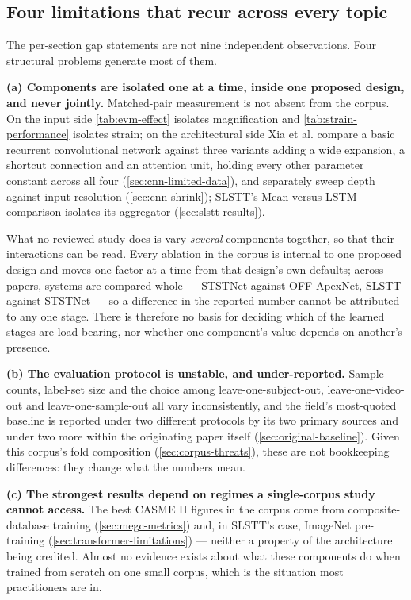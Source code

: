 \subsection{Four limitations that recur across every topic}
\label{sec:four-limitations}

The per-section gap statements are not nine independent observations. Four structural problems generate most of them.

\textbf{(a) Components are isolated one at a time, inside one proposed design, and never jointly.} Matched-pair measurement is not absent from the corpus. On the input side \autoref{tab:evm-effect} isolates magnification and \autoref{tab:strain-performance} isolates strain; on the architectural side Xia et al. compare a basic recurrent convolutional network against three variants adding a wide expansion, a shortcut connection and an attention unit, holding every other parameter constant across all four (\autoref{sec:cnn-limited-data}), and separately sweep depth against input resolution (\autoref{sec:cnn-shrink}); SLSTT's Mean-versus-LSTM comparison isolates its aggregator (\autoref{sec:slstt-results}).

What no reviewed study does is vary \textit{several} components together, so that their interactions can be read. Every ablation in the corpus is internal to one proposed design and moves one factor at a time from that design's own defaults; across papers, systems are compared whole --- STSTNet against OFF-ApexNet, SLSTT against STSTNet --- so a difference in the reported number cannot be attributed to any one stage. There is therefore no basis for deciding which of the learned stages are load-bearing, nor whether one component's value depends on another's presence.

\textbf{(b) The evaluation protocol is unstable, and under-reported.} Sample counts, label-set size and the choice among leave-one-subject-out, leave-one-video-out and leave-one-sample-out all vary inconsistently, and the field's most-quoted baseline is reported under two different protocols by its two primary sources and under two more within the originating paper itself (\autoref{sec:original-baseline}). Given this corpus's fold composition (\autoref{sec:corpus-threats}), these are not bookkeeping differences: they change what the numbers mean.

\textbf{(c) The strongest results depend on regimes a single-corpus study cannot access.} The best CASME II figures in the corpus come from composite-database training (\autoref{sec:megc-metrics}) and, in SLSTT's case, ImageNet pre-training (\autoref{sec:transformer-limitations}) --- neither a property of the architecture being credited. Almost no evidence exists about what these components do when trained from scratch on one small corpus, which is the situation most practitioners are in.

